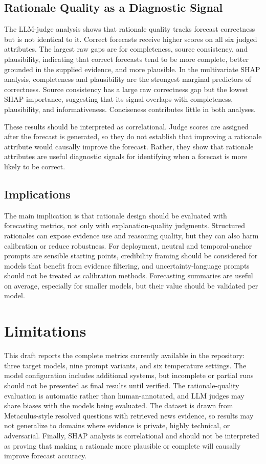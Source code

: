 \documentclass[11pt]{article}
\begin{document}
\subsection{Rationale Quality as a Diagnostic Signal}

The LLM-judge analysis shows that rationale quality tracks forecast correctness but is not identical to it.
Correct forecasts receive higher scores on all six judged attributes.
The largest raw gaps are for completeness, source consistency, and plausibility, indicating that correct forecasts tend to be more complete, better grounded in the supplied evidence, and more plausible.
In the multivariate SHAP analysis, completeness and plausibility are the strongest marginal predictors of correctness.
Source consistency has a large raw correctness gap but the lowest SHAP importance, suggesting that its signal overlaps with completeness, plausibility, and informativeness.
Conciseness contributes little in both analyses.

These results should be interpreted as correlational.
Judge scores are assigned after the forecast is generated, so they do not establish that improving a rationale attribute would causally improve the forecast.
Rather, they show that rationale attributes are useful diagnostic signals for identifying when a forecast is more likely to be correct.

\subsection{Implications}

The main implication is that rationale design should be evaluated with forecasting metrics, not only with explanation-quality judgments.
Structured rationales can expose evidence use and reasoning quality, but they can also harm calibration or reduce robustness.
For deployment, neutral and temporal-anchor prompts are sensible starting points, credibility framing should be considered for models that benefit from evidence filtering, and uncertainty-language prompts should not be treated as calibration methods.
Forecasting summaries are useful on average, especially for smaller models, but their value should be validated per model.

\section{Limitations}

This draft reports the complete metrics currently available in the repository: three target models, nine prompt variants, and six temperature settings.
The model configuration includes additional systems, but incomplete or partial runs should not be presented as final results until verified.
The rationale-quality evaluation is automatic rather than human-annotated, and LLM judges may share biases with the models being evaluated.
The dataset is drawn from Metaculus-style resolved questions with retrieved news evidence, so results may not generalize to domains where evidence is private, highly technical, or adversarial.
Finally, SHAP analysis is correlational and should not be interpreted as proving that making a rationale more plausible or complete will causally improve forecast accuracy.
\end{document}

